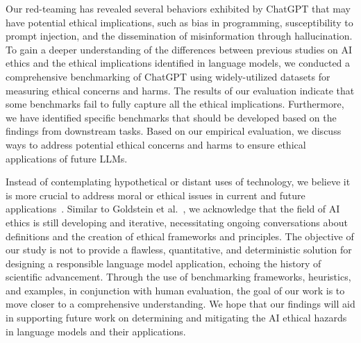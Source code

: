 Our red-teaming has revealed several behaviors exhibited by ChatGPT that may have potential ethical implications, such as bias in programming, susceptibility to prompt injection, and the dissemination of misinformation through hallucination. To gain a deeper understanding of the differences between previous studies on AI ethics and the ethical implications identified in language models, we conducted a comprehensive benchmarking of ChatGPT using widely-utilized datasets for measuring ethical concerns and harms. The results of our evaluation indicate that some benchmarks fail to fully capture all the ethical implications. Furthermore, we have identified specific benchmarks that should be developed based on the findings from downstream tasks. Based on our empirical evaluation, we discuss ways to address potential ethical concerns and harms to ensure ethical applications of future LLMs.

Instead of contemplating hypothetical or distant uses of technology, we believe it is more crucial to address moral or ethical issues in current and future applications~\cite{khurana2022natural}. Similar to Goldstein et al.~\cite{goldstein2023generative}, we acknowledge that the field of AI ethics is still developing and iterative, necessitating ongoing conversations about definitions and the creation of ethical frameworks and principles. The objective of our study is not to provide a flawless, quantitative, and deterministic solution for designing a responsible language model application, echoing the history of scientific advancement\cite{taddeo2018ai,jobin2019global}. Through the use of benchmarking frameworks, heuristics, and examples, in conjunction with human evaluation, the goal of our work is to move closer to a comprehensive understanding. We hope that our findings will aid in supporting future work on determining and mitigating the AI ethical hazards in language models and their applications.